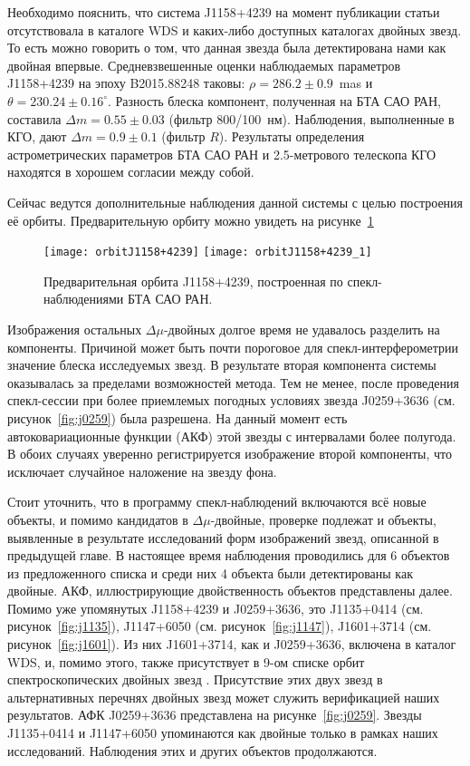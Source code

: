 Необходимо пояснить, что система J1158+4239 на момент публикации статьи отсутствовала в каталоге WDS и каких-либо доступных каталогах двойных звезд. То есть можно говорить о том, что данная звезда была детектирована нами как двойная впервые. Средневзвешенные оценки наблюдаемых параметров J1158+4239 на  эпоху B2015.88248 таковы: $\rho = 286.2\pm0.9$~mas и $\theta=230.24\pm0.16^\circ$. Разность блеска компонент, полученная на БТА САО РАН, составила $\Delta m = 0.55\pm0.03$ (фильтр 800/100~нм). Наблюдения, выполненные в КГО, дают $\Delta m = 0.9\pm0.1$ (фильтр $R$). Результаты определения астрометрических параметров БТА САО РАН и 2.5-метрового телескопа КГО находятся в хорошем согласии между собой.  

Сейчас ведутся дополнительные наблюдения данной системы с целью построения её орбиты. Предварительную орбиту можно увидеть на рисунке~\ref{fig:orbit}


\begin{figure}
\centering
\texttt{[image: orbitJ1158+4239]}
\texttt{[image: orbitJ1158+4239\_1]}
\caption{Предварительная орбита J1158+4239, построенная по спекл-наблюдениями БТА САО РАН.}
\label{fig:orbit}
\end{figure}


Изображения остальных $\Delta\mu$-двойных долгое время не удавалось разделить на компоненты. Причиной может быть почти пороговое для спекл-интерферометрии значение блеска исследуемых звезд. В результате вторая компонента системы оказывалась за пределами возможностей метода. Тем не менее, после проведения спекл-сессии при более приемлемых погодных условиях звезда  J0259+3636 (см. рисунок~\ref{fig:j0259}) была разрешена. На данный момент есть автоковариационные функции (АКФ) этой звезды с интервалами более полугода. В обоих случаях уверенно регистрируется изображение второй компоненты, что исключает случайное наложение на звезду фона.

Стоит уточнить, что в программу спекл-наблюдений включаются всё новые объекты, и помимо кандидатов в $\Delta\mu$-двойные, проверке подлежат и объекты, выявленные в результате исследований форм изображений звезд, описанной в предыдущей главе. В настоящее время наблюдения проводились для 6 объектов из предложенного списка и среди них  4 объекта были детектированы как двойные. АКФ, иллюстрирующие двойственность объектов представлены далее. Помимо уже упомянутых J1158+4239 и J0259+3636, это  J1135+0414 (см. рисунок~\ref{fig:j1135}), J1147+6050 (см. рисунок~\ref{fig:j1147}), J1601+3714 (см. рисунок~\ref{fig:j1601}). Из них  J1601+3714, как и J0259+3636, включена в каталог WDS, и, помимо этого, также присутствует в 9-ом списке орбит спектроскопических двойных звезд \cite{2004A&A...424..727P}. Присутствие этих двух звезд в альтернативных перечнях двойных звезд может служить верификацией наших результатов. АФК J0259+3636 представлена на рисунке~\ref{fig:j0259}. Звезды J1135+0414 и J1147+6050 упоминаются как двойные только в рамках наших исследований. Наблюдения этих и других объектов продолжаются.

